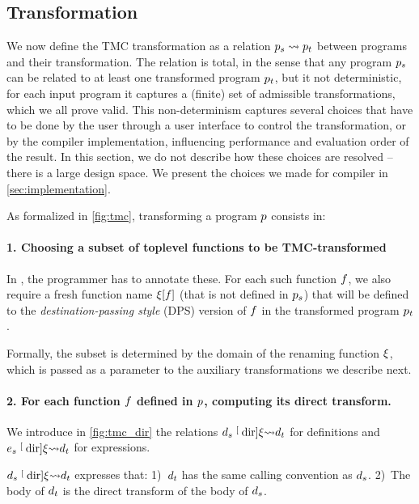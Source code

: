 \subsection{Transformation}

We now define the TMC transformation as a relation $\datalangProg_s \tmc \datalangProg_t$ between programs and their transformation. The relation is total, in the sense that any \DataLang program $\datalangProg_s$ can be related to at least one transformed program $\datalangProg_t$, but it not deterministic, for each input program it captures a (finite) set of admissible transformations, which we all prove valid. This non-determinism captures several choices that have to be done by the user through a user interface to control the transformation, or by the compiler implementation, influencing performance and evaluation order of the result. In this section, we do not describe how these choices are resolved -- there is a large design space. We present the choices we made for \OCaml compiler in \cref{sec:implementation}.

As formalized in \cref{fig:tmc}, transforming a \DataLang program $\datalangProg$ consists in:

\paragraph{1. Choosing a subset of toplevel functions to be TMC-transformed}
In \OCaml, the programmer has to annotate these.
For each such function $\datalangFn$, we also require a fresh function name $\datalangRenaming [\datalangFn]$ (that is not defined in $\datalangProg_s$) that will be defined to the \emph{destination-passing style} (DPS) version of $\datalangFn$ in the transformed program $\datalangProg_t$.

Formally, the subset is determined by the domain of the renaming function $\xi$, which is passed as a parameter to the auxiliary transformations we describe next.

\paragraph{2. For each function $\datalangFn$ defined in $\datalangProg$, computing its direct transform.}
We introduce in \cref{fig:tmc_dir} the relations $\datalangDef_s \tmcDir{\datalangRenaming} \datalangDef_t$ for definitions and $\datalangExpr_s \tmcDir{\datalangRenaming} \datalangDef_t$ for expressions.

$\datalangDef_s \tmcDir{\datalangRenaming} \datalangDef_t$ expresses that:
1)~$\datalangDef_t$ has the same calling convention as $\datalangDef_s$.
2)~The body of $\datalangDef_t$ is the direct transform of the body of $\datalangDef_s$.


